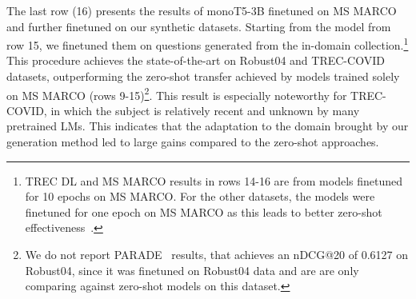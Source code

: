 \documentclass[11pt]{article}
\begin{document}


The last row (16) presents the results of monoT5-3B finetuned on MS MARCO and further finetuned on our synthetic datasets. Starting from the model from row 15, we finetuned them on questions generated from the in-domain collection.\footnote{TREC DL and MS MARCO results in rows 14-16 are from models finetuned for 10 epochs on MS MARCO. For the other datasets, the models were finetuned for one epoch on MS MARCO as this leads to better zero-shot effectiveness~\cite{Pradeep2020H2olooAT}.} This procedure achieves the state-of-the-art on Robust04 and TREC-COVID datasets, outperforming the zero-shot transfer achieved by models trained solely on MS MARCO (rows 9-15)\footnote{We do not report PARADE~\cite{li2020parade} results, that achieves an nDCG@20 of 0.6127 on Robust04, since it was finetuned on Robust04 data and are are only comparing against zero-shot models on this dataset.}. This result is especially noteworthy for TREC-COVID, in which the subject is relatively recent and unknown by many pretrained LMs. This indicates that the adaptation to the domain brought by our generation method led to large gains compared to the zero-shot approaches.
\end{document}
